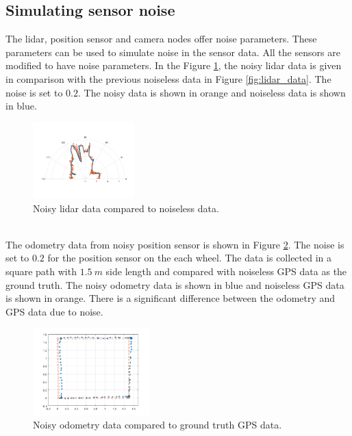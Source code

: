\documentclass[11pt]{article}
\begin{document}
    \subsection{Simulating sensor noise}
    The lidar, position sensor and camera nodes offer noise parameters. These parameters can be used to simulate noise in the sensor data. 
    All the sensors are modified to have noise parameters. In the Figure \ref{fig:lidar-noise}, the noisy lidar data is given in comparison with the previous noiseless data in Figure \ref{fig:lidar_data}. The noise is set to $0.2$.
    The noisy data is shown in orange and noiseless data is shown in blue. 
    \begin{figure}[ht!]
        \centering
        \includegraphics[width = 0.35\textwidth]{noisy_lidar.png}
        \caption{Noisy lidar data compared to noiseless data.}
        \label{fig:lidar-noise}
    \end{figure}
    \\
    \noindent The odometry data from noisy position sensor is shown in Figure \ref{fig:odometry-noise}. The noise is set to $0.2$ for the position sensor on the each wheel. The data is collected in a square path with $1.5 \ m$ side length and compared with noiseless GPS data as the ground truth.
    The noisy odometry data is shown in blue and noiseless GPS data is shown in orange. 
    There is a significant difference between the odometry and GPS data due to noise.
    \begin{figure}[ht!]
        \centering
        \includegraphics[width = 0.4\textwidth]{noisy_encoder.png}
        \caption{Noisy odometry data compared to ground truth GPS data.}
        \label{fig:odometry-noise}
    \end{figure}
    \\
\end{document}
